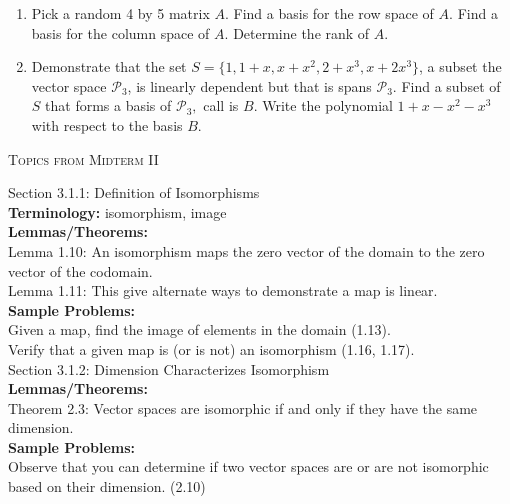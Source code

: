 \documentclass[11pt,fleqn]{article}
\begin{document}
\begin{enumerate}
\item Pick a random 4 by 5 matrix $A$. Find a basis for the row space of $A$. Find a basis for the column space of $A.$ Determine the rank of $A.$

\item Demonstrate that the set $S=\{1, 1+x, x+x^2, 2+x^3, x+2x^3\}$, a subset the vector space $\mathcal{P}_3$, is linearly dependent but that is spans $\mathcal{P}_3$. Find a subset of $S$ that forms a basis of $\mathcal{P}_3,$ call is $B.$ Write the polynomial $1+x-x^2-x^3$ with respect to the basis $B.$

\end{enumerate}

\newpage


\begin{center} \textsc{Topics from Midterm II} \end{center}

\noindent Section 3.1.1: Definition of Isomorphisms\\

\textbf{Terminology:} isomorphism, image\\

\textbf{Lemmas/Theorems:}  \\
Lemma 1.10: An isomorphism maps the zero vector of the domain to the zero vector of the codomain.\\
Lemma 1.11: This give alternate ways to demonstrate a map is linear.\\

\textbf{Sample Problems:} \\
Given a map, find the image of elements in the domain (1.13). \\
Verify that a given map is (or is not) an isomorphism (1.16, 1.17).\\

\noindent Section 3.1.2: Dimension Characterizes Isomorphism\\


\textbf{Lemmas/Theorems:} \\
Theorem 2.3: Vector spaces are isomorphic if and only if they have the same dimension.\\

\textbf{Sample Problems:} \\
Observe that you can determine if two vector spaces are or are not isomorphic based on their dimension. (2.10)\\
\end{document}
